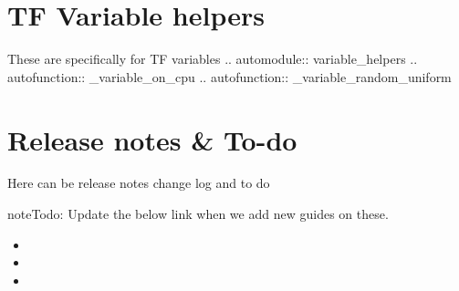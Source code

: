 \documentclass[letterpaper,10pt,english]{sphinxmanual}
\begin{document}
\chapter{TF Variable helpers}
\label{\detokenize{neuralnet/variable_helpers:tf-variable-helpers}}\label{\detokenize{neuralnet/variable_helpers::doc}}
These are specifically for TF variables
.. automodule:: variable\_helpers
.. autofunction:: \_variable\_on\_cpu
.. autofunction:: \_variable\_random\_uniform


\chapter{Release notes \& To-do}
\label{\detokenize{todo:release-notes-to-do}}\label{\detokenize{todo::doc}}
Here can be release notes change log and to do

\begin{sphinxadmonition}{note}{\label{todo:index-0}Todo:}
Update the below link when we add new guides on these.
\end{sphinxadmonition}
\begin{itemize}
\item {} 

\item {} 

\item {} 

\end{itemize}


\renewcommand{\indexname}{Python Module Index}
\begin{sphinxtheindex}
\let\bigletter\sphinxstyleindexlettergroup
\bigletter{c}
\item\relax{}
\indexspace
\bigletter{i}
\item\relax{}
\indexspace
\bigletter{l}
\item\relax{}
\indexspace
\bigletter{n}
\item\relax{}
\indexspace
\bigletter{p}
\item\relax{}
\indexspace
\bigletter{r}
\item\relax{}
\indexspace
\bigletter{s}
\item\relax{}
\indexspace
\bigletter{t}
\item\relax{}
\end{sphinxtheindex}

\renewcommand{\indexname}{Index}
\printindex
\end{document}
